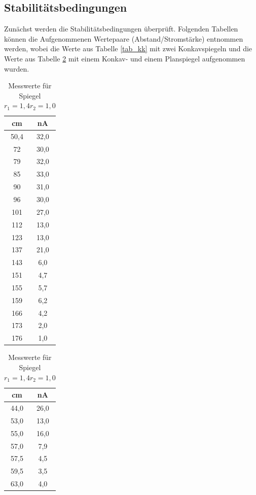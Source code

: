 \subsection{Stabilitätsbedingungen}
Zunächst werden die Stabilitätsbedingungen überprüft. Folgenden Tabellen können die Aufgenommenen Wertepaare (Abstand/Stromstärke) entnommen werden, wobei die Werte aus Tabelle \ref{tab_kk} mit zwei Konkavspiegeln und die Werte aus Tabelle \ref{tab_kf} mit einem Konkav- und einem Planspiegel aufgenommen wurden.
\begin{table}[htbp]
	\begin{minipage}[t]{0.45\textwidth} 
	\begin{tabular}[t]{c|c}
	cm & nA\\ \hline
	50,4 &   32,0\\
 	72    &  30,0\\
 	79     & 32,0\\
 	85      &33,0\\
 	90      &31,0\\
 	96      &30,0\\
 	101     &27,0\\
 	112     &13,0\\
 	123     &13,0\\
 	137     &21,0\\
 	143     &6,0\\
 	151     &4,7\\
 	155     &5,7\\
 	159     &6,2\\
 	166     &4,2\\
 	173     &2,0\\
 	176     &1,0
	\end{tabular}
	\caption{Messwerte für Spiegel $r_1=1,4 r_2=1,4$}
	\label{tab_kk}
	\end{minipage}
	\begin{minipage}[t]{0.45\textwidth} 
	\begin{tabular}[t]{c|c}
	cm & nA\\ \hline
	44,0&    26,0\\
	53,0&    13,0\\
	55,0&    16,0\\
	57,0&    7,9\\
	57,5&    4,5\\
	59,5&    3,5\\
	63,0&    4,0
	\end{tabular}
	\caption{Messwerte für Spiegel $r_1=1,4 r_2=1,0$}
	\label{tab_kf}
	\end{minipage}
\end{table}


